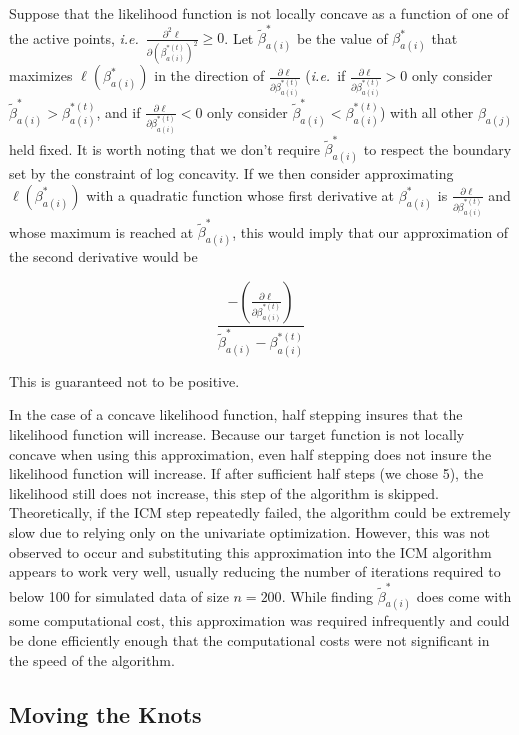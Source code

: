 	Suppose that the likelihood function is not locally concave as a function of one of the active points, \emph{i.e.}\ $ \frac{\partial^2 \ell} { \partial {(\beta^{*(t)}_{a(i)})}^2} \geq 0$. Let $\tilde \beta^*_{a(i)}$ be the value of $\beta^*_{a(i)}$ that maximizes $\ell(\beta^*_{a(i)})$ in the direction of $ \frac{\partial \ell} {\partial \beta^{*(t)}_{a(i)}} $ (\emph{i.e.}\ if $  \frac{\partial \ell} {\partial \beta^{*(t)}_{a(i)}} > 0$ only consider  $\tilde \beta^*_{a(i)} > \beta^{*(t)}_{a(i)}$, and if $  \frac{\partial \ell} {\partial \beta^{*(t)}_{a(i)}}< 0 $ only consider $\tilde \beta^*_{a(i)} < \beta^{*(t)}_{a(i)}$)  with all other $\beta_{a(j)}$ held fixed. It is worth noting that we don't require $\tilde \beta^*_{a(i)}$ to respect the boundary set by the constraint of log concavity. If we then consider approximating $\ell(\beta^*_{a(i)})$ with a quadratic function whose first derivative at $\beta^*_{a(i)}$ is $  \frac{\partial \ell} {\partial \beta^{*(t)}_{a(i)}} $ and whose maximum is reached at $\tilde \beta^*_{a(i)}$, this would imply that our approximation of the second derivative would be
	
	 \[\frac{- \left( \frac{\partial \ell} {\partial \beta^{*(t)}_{a(i)} }  \right) } {\tilde \beta^*_{a(i)} -\beta^{*(t)}_{a(i)}}
	 \]
	 
	 This is guaranteed not to be positive.
	
	In the case of a concave likelihood function, half stepping insures that the likelihood function will increase. Because our target function is not locally concave when using this approximation, even half stepping does not insure the likelihood function will increase. If after sufficient half steps (we chose 5), the likelihood still does not increase, this step of the algorithm is skipped. Theoretically, if the ICM step repeatedly failed, the algorithm could be extremely slow due to relying only on the univariate optimization. However, this was not observed to occur and substituting this approximation into the ICM algorithm appears to work very well, usually reducing the number of iterations required to below 100 for simulated data of size $n = 200$. While finding  $\tilde \beta^*_{a(i)}$ does come with some computational cost, this approximation was required infrequently and could be done efficiently enough that the computational costs were not significant in the speed of the algorithm. 
	
		{\subsection{Moving the Knots} } 
	
